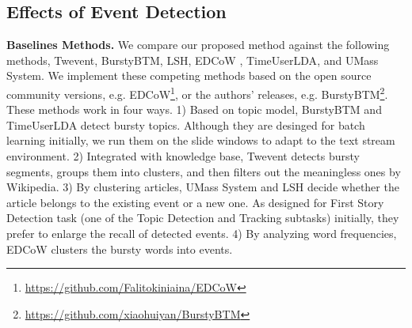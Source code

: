 \documentclass{article}
\begin{document}

\subsection{Effects of Event Detection}
\textbf{Baselines Methods.} We compare our proposed method against the following methods, Twevent\cite{Twevent2012}, BurstyBTM\cite{Yan:2015wm}, LSH\cite{Petrovic:2010uj}, EDCoW \cite{Weng:2011wz}, TimeUserLDA\cite{Diao:2012wj}, and UMass System\cite{Allan:2000wu}.
We implement these competing methods based on the open source community versions, e.g. EDCoW\footnote{\url{https://github.com/Falitokiniaina/EDCoW}}, or the authors' releases, e.g. BurstyBTM\footnote{\url{https://github.com/xiaohuiyan/BurstyBTM}}.
These methods work in four ways. 
1) Based on topic model, BurstyBTM and TimeUserLDA detect bursty topics. 
Although they are desinged for batch learning initially, we run them on the slide windows to adapt to the text stream environment.
2) Integrated with knowledge base, Twevent detects bursty segments, groups them into clusters, and then filters out the meaningless ones by Wikipedia.
3) By clustering articles, UMass System and LSH decide whether the article belongs to the existing event or a new one.
As designed for First Story Detection task (one of the Topic Detection and Tracking subtasks\cite{allan2012topic}) initially, they prefer to enlarge the recall of detected events. 
4) By analyzing word frequencies, EDCoW clusters the bursty words into events.
\end{document}
